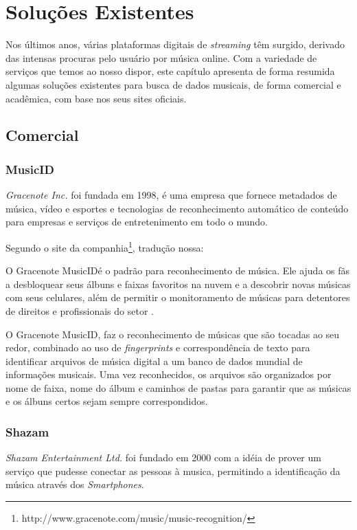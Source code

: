 \chapter{Soluções Existentes} \label{solucoes}
Nos últimos anos, várias plataformas digitais de \textit{streaming} têm surgido, derivado das intensas procuras pelo usuário por música online. Com a variedade de serviços que temos ao nosso dispor, este capítulo apresenta de forma resumida algumas soluções existentes para busca de dados musicais, de forma comercial e acadêmica, com base nos seus sites oficiais.

\section{Comercial}

\subsection{MusicID}
\textit{Gracenote Inc.} foi fundada em 1998, é uma empresa que fornece metadados de música, vídeo e esportes e tecnologias de reconhecimento automático de conteúdo para empresas e serviços de entretenimento em todo o mundo.

Segundo o site da companhia\footnote{http://www.gracenote.com/music/music-recognition/}, tradução nossa:

\begin{citacao}
O Gracenote MusicID\textregistered é o padrão para reconhecimento de música. Ele ajuda os fãs a desbloquear seus álbuns e faixas favoritos na nuvem e a descobrir novas músicas com seus celulares, além de permitir o monitoramento de músicas para detentores de direitos e profissionais do setor \cite{musicid1998}.
\end{citacao}

O Gracenote MusicID\textregistered, faz o reconhecimento de músicas que são tocadas ao seu redor, combinado ao uso de \textit{fingerprints} e correspondência de texto para identificar arquivos de música digital a um banco de dados mundial de informações musicais. Uma vez reconhecidos, os arquivos são organizados por nome de faixa, nome do álbum e caminhos de pastas para garantir que as músicas e os álbuns certos sejam sempre correspondidos.

\subsection{Shazam}
\textit{Shazam Entertainment Ltd.} foi fundado em 2000 com a idéia de prover um serviço que pudesse conectar as pessoas à musica, permitindo a identificação da música através dos \textit{Smartphones}.

